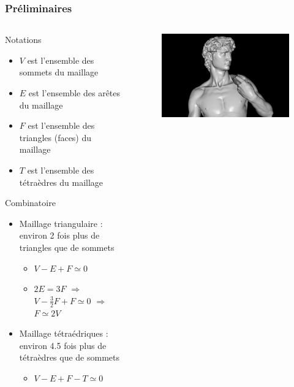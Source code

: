 \documentclass[9pt]{beamer}
\begin{document}
\begin{frame}
\small
\frametitle{Préliminaires}

\begin{columns}[c]
    \begin{column}[c]{.6\textwidth}
 		\begin{block}{Notations}
\begin{itemize}
\item $V$ est l'ensemble des sommets du maillage
\item $E$ est l'ensemble des arêtes du maillage
\item $F$ est l'ensemble des triangles (faces) du maillage
\item $T$ est l'ensemble des tétraèdres du maillage
\end{itemize}
\end{block}
\begin{block}{Combinatoire}
\begin{itemize}
\item Maillage triangulaire : environ 2 fois plus de triangles que de sommets
\begin{itemize}
\item $V-E+F\simeq 0$
\item $2E=3F$ $\Rightarrow$ $V-\frac{3}{2}F+F\simeq 0$ $\Rightarrow$ $F\simeq 2V$
\end{itemize}
\item Maillage tétraédriques : environ 4.5 fois plus de tétraèdres que de sommets
\begin{itemize}
\item $V-E+F-T\simeq 0$
\end{itemize}
\end{itemize}
\end{block}
    \end{column}%
    \begin{column}[c]{.37\textwidth}
    \vspace{-15.5pt}
    \begin{figure}
    \includegraphics[scale=0.09]{Images/michelangelo}

\end{figure}
\end{column}
\end{columns}
\end{frame}
\end{document}
